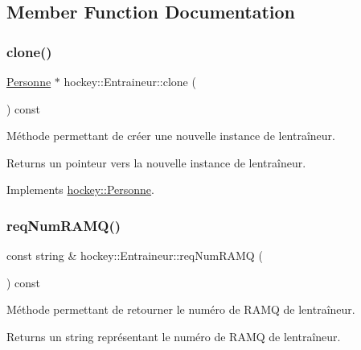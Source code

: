 \subsection{Member Function Documentation}
\mbox{\label{classhockey_1_1Entraineur_a734eb3d04a6209542fbfc989c398613e}} 
\subsubsection{\texorpdfstring{clone()}{clone()}}
{\footnotesize\ttfamily \hyperlink{classhockey_1_1Personne}{Personne} $\ast$ hockey\+::\+Entraineur\+::clone (\begin{DoxyParamCaption}{ }\end{DoxyParamCaption}) const\hspace{0.3cm}{\ttfamily [virtual]}}



Méthode permettant de créer une nouvelle instance de l\textquotesingle{}entraîneur. 

\begin{DoxyReturn}{Returns}
un pointeur vers la nouvelle instance de l\textquotesingle{}entraîneur. 
\end{DoxyReturn}


Implements \hyperlink{classhockey_1_1Personne}{hockey\+::\+Personne}.

\mbox{\label{classhockey_1_1Entraineur_a7f9bb4ef1197e785be0cd7e506f26bbd}} 
\subsubsection{\texorpdfstring{req\+Num\+R\+A\+M\+Q()}{reqNumRAMQ()}}
{\footnotesize\ttfamily const string \& hockey\+::\+Entraineur\+::req\+Num\+R\+A\+MQ (\begin{DoxyParamCaption}{ }\end{DoxyParamCaption}) const}



Méthode permettant de retourner le numéro de R\+A\+MQ de l\textquotesingle{}entraîneur. 

\begin{DoxyReturn}{Returns}
un string représentant le numéro de R\+A\+MQ de l\textquotesingle{}entraîneur. 
\end{DoxyReturn}
\mbox{\label{classhockey_1_1Entraineur_a376149c10b8541c45d703682d41d80f3}} 
